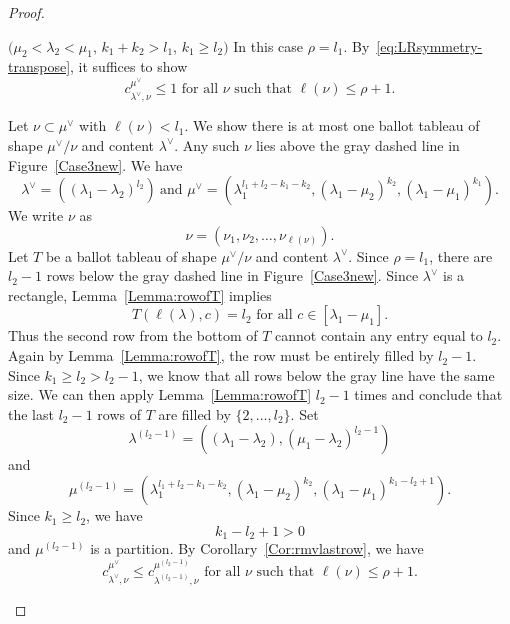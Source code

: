 \begin{proof}
\begin{Case}
\begin{figure}[htb]
 \caption[Case 3]{}
 
\end{figure}



\end{Case}

\begin{Case}
{ $(\mu_2<\lambda_2<\mu_1$, $k_1+k_2 > l_1$, $k_1\geq l_2)$} 
In this case $\rho = l_1$. By~\eqref{eq:LRsymmetry-transpose}, it suffices to show
\[
c^{\mu^\vee}_{\lambda^\vee,\nu} \leq 1 \text{ for all }\nu\text{ such that }\ell(\nu)\leq \rho+1.
\]

Let $\nu\subset \mu^\vee$ with $\ell(\nu) < l_1$. We show there is at most one ballot tableau of shape $\mu^\vee / \nu$ and content $\lambda^\vee$. Any such $\nu$ lies above the gray dashed line in Figure~\ref{Case3new}. We have
\[
\lambda^\vee = ((\lambda_1-\lambda_2)^{l_2})\ \text{and }\mu^\vee = (\lambda_1^{l_1+l_2-k_1-k_2}, (\lambda_1-\mu_2)^{k_2},(\lambda_1-\mu_1)^{k_1}).
\]
We write $\nu$ as
\[
\nu = (\nu_1,\nu_2,\ldots,\nu_{\ell(\nu)}).
\]
Let $T$ be a ballot tableau of shape $\mu^\vee / \nu$ and content $\lambda^\vee$. Since $\rho=l_1$, there are $l_2-1$ rows below the gray dashed line in Figure~\ref{Case3new}. Since $\lambda^\vee$ is a rectangle, Lemma~\ref{Lemma:rowofT} implies
\[
T(\ell(\lambda),c) = l_2 \text{ for all } c\in[\lambda_1-\mu_1].
\]
Thus the second row from the bottom of $T$ cannot contain any entry equal to $l_2$. Again by Lemma~\ref{Lemma:rowofT}, the row must be entirely filled by $l_2-1$. Since $k_1\geq l_2>l_2-1$, we know that all rows below the gray line have the same size. We can then apply Lemma~\ref{Lemma:rowofT} $l_2-1$ times and conclude that the last $l_2-1$ rows of $T$ are filled by $\{2,\ldots,l_2\}$. Set
\[
\lambda^{(l_2-1)} = ((\lambda_1-\lambda_2),(\mu_1-\lambda_2)^{l_2-1})
\] 
and 
\[
\mu^{(l_2-1)} = (\lambda_1^{l_1+l_2-k_1-k_2}, (\lambda_1-\mu_2)^{k_2},(\lambda_1-\mu_1)^{k_1-l_2+1}).
\]
Since $k_1\geq l_2$, we have 
\begin{equation}\label{eqn:Case3}
 k_1-l_2+1> 0
\end{equation}
and $\mu^{(l_2-1)}$ is a partition.
By Corollary~\ref{Cor:rmvlastrow}, we have
\begin{equation}
\label{eq:Case4bound}
c^{\mu^\vee}_{\lambda^\vee,\nu}\leq c^{\mu^{(l_2-1)}}_{\lambda^{(l_2-1)},\nu}\text{ for all }\nu\text{ such that }\ell(\nu)\leq \rho+1.
\end{equation}


\end{Case}
\end{proof}

